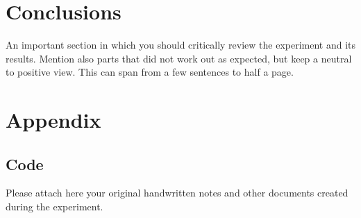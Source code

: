 \documentclass[12pt,a4paper]{article}
\begin{document}
\section{Conclusions}
An important section in which you should critically review the experiment and its results. Mention also parts that did not work out as expected, but keep a neutral to positive view. This can span from a few sentences to half a page.

\setcounter{secnumdepth}{0}

\printbibliography
\appendix
\section{Appendix}
\subsection{Code}
\label{code}
Please attach here your original handwritten notes and other documents created during the experiment.
\end{document}
